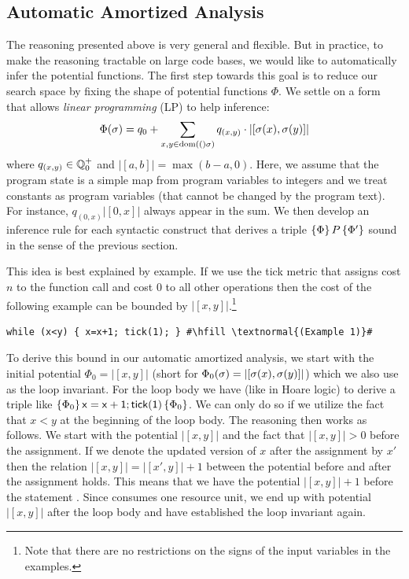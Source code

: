 \documentclass[nocopyrightspace,preprint]{sigplanconf}
\begin{document}

\subsection{Automatic Amortized Analysis}

The reasoning presented above is very general and flexible.  But in
practice, to make the reasoning tractable on large code bases, we would
like to automatically infer the potential functions.  The first step
towards this goal is to reduce our search space by fixing the shape
of potential functions $\Phi$.  We settle on a form that allows
\emph{linear programming} (LP) to help inference:
%
%
$$
\Phi(\sigma) = q_0 + \sum_{x,y \in  \text{dom}(()\sigma)}
  q_{(x,y)} \cdot |[\sigma(x),\sigma(y)]|
$$
where $q_{(x,y)} \in \mathbb Q^+_0$ and $|[a,b]| = \max(b-a,0)$.  Here, we assume
that the program state is a simple map from program variables to integers
and we treat constants as program variables (that cannot be changed
by the program text).  For instance, $q_{(0,x)}|[0,x]|$ always appear in
the sum.  We then develop an inference rule for each syntactic construct
that derives a triple $\{\Phi\}\, P\, \{\Phi'\}$ sound in the sense of
the previous section.

This idea is best explained by example.  If we use the tick metric that
assigns cost $n$ to the function call  and cost $0$ to all
other operations then the cost of the following example can be bounded
by $|[x,y]|$.\footnote{Note that there are no restrictions on the signs
of the input variables in the examples.}
\begin{lstlisting}[basicstyle=\tt\small]
while (x<y) { x=x+1; tick(1); } #\hfill \textnormal{(Example 1)}#
\end{lstlisting}
To derive this bound in our automatic amortized analysis, we start with
the initial potential $\Phi_0 = |[x,y]|$ (short for $\Phi_0(\sigma)
= |[\sigma(x),\sigma(y)]|$) which we also use as the loop invariant.
For the loop body we have (like in Hoare logic) to derive a triple
like $\{\Phi_0\}\, \mathsf{x=x+1;tick(1)}\, \{\Phi_0\}$.  We can only do
so if we utilize the fact that $x<y$ at the beginning of the loop body.
The reasoning then works as follows. We start with the potential $|[x,y]|$
and the fact that $|[x,y]| > 0$ before the assignment.  If we denote the
updated version of $x$ after the assignment by $x'$ then the relation
$|[x,y]| = |[x',y]| + 1$ between the potential before and after the
assignment  holds.  This means that we have the potential
$|[x,y]| + 1$ before the statement .  Since 
consumes one resource unit, we end up with potential $|[x,y]|$ after
the loop body and have established the loop invariant again.
\end{document}
